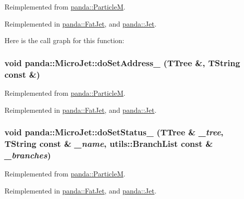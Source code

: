 Reimplemented from \hyperlink{classpanda_1_1ParticleM_a0c24df56cbd50a8223fc4d8bf0b776d0}{panda::ParticleM}.

Reimplemented in \hyperlink{classpanda_1_1FatJet_a8a4681a9c643494786d131103f281aa8}{panda::FatJet}, and \hyperlink{classpanda_1_1Jet_a3bc50ef589095a1bae03b1f4bbf74077}{panda::Jet}.

Here is the call graph for this function:\hypertarget{classpanda_1_1MicroJet_a6a8758a218f0e0ce60a1af0a999ff598}{
\subsubsection[{doSetAddress\_\-}]{\setlength{\rightskip}{0pt plus 5cm}void panda::MicroJet::doSetAddress\_\- (TTree \&, \/  TString const \&)}}
\label{classpanda_1_1MicroJet_a6a8758a218f0e0ce60a1af0a999ff598}


Reimplemented from \hyperlink{classpanda_1_1ParticleM_ab54d46a237f8d12074ee36c48af33b04}{panda::ParticleM}.

Reimplemented in \hyperlink{classpanda_1_1FatJet_a3f92ff4d7d7bb8f83fa43e4ef20bc036}{panda::FatJet}, and \hyperlink{classpanda_1_1Jet_a4e59030d68ca3a27fb72f0c0976bdb27}{panda::Jet}.\hypertarget{classpanda_1_1MicroJet_ae7b83b860f85cc86b736495317fb7f3a}{
\subsubsection[{doSetStatus\_\-}]{\setlength{\rightskip}{0pt plus 5cm}void panda::MicroJet::doSetStatus\_\- (TTree \& {\em \_\-tree}, \/  TString const \& {\em \_\-name}, \/  {\bf utils::BranchList} const \& {\em \_\-branches})}}
\label{classpanda_1_1MicroJet_ae7b83b860f85cc86b736495317fb7f3a}


Reimplemented from \hyperlink{classpanda_1_1ParticleM_a042f9e295576be022960ea88144e9022}{panda::ParticleM}.

Reimplemented in \hyperlink{classpanda_1_1FatJet_ad63603b0bd69d4e3b6173a194b3e6829}{panda::FatJet}, and \hyperlink{classpanda_1_1Jet_a494d27c6c2b773f5849996944cf46eb2}{panda::Jet}.

